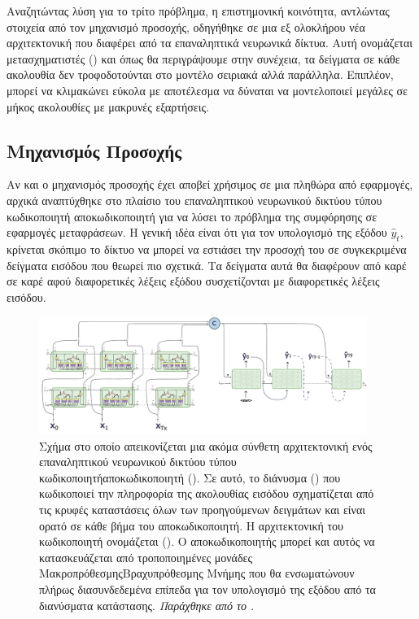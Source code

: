 Αναζητώντας λύση για το τρίτο πρόβλημα, η επιστημονική κοινότητα, αντλώντας στοιχεία από τον μηχανισμό προσοχής, οδηγήθηκε σε μια εξ ολοκλήρου νέα αρχιτεκτονική που διαφέρει από τα επαναληπτικά νευρωνικά δίκτυα. Αυτή ονομάζεται μετασχηματιστές ()\cite{transformers_attention_is_all_you_need} και όπως θα περιγράψουμε στην συνέχεια, τα δείγματα σε κάθε ακολουθία δεν τροφοδοτούνται στο μοντέλο σειριακά αλλά παράλληλα. Επιπλέον, μπορεί να κλιμακώνει εύκολα με αποτέλεσμα να δύναται να μοντελοποιεί μεγάλες σε μήκος ακολουθίες με μακρυνές εξαρτήσεις.\par

\subsection{Μηχανισμός Προσοχής}
Αν και ο μηχανισμός προσοχής έχει αποβεί χρήσιμος σε μια πληθώρα από εφαρμογές, αρχικά αναπτύχθηκε στο πλαίσιο του επαναληπτικού νευρωνικού δικτύου τύπου κωδικοποιητή αποκωδικοποιητή για να λύσει το πρόβλημα της συμφόρησης σε εφαρμογές μεταφράσεων. Η γενική ιδέα είναι ότι για τον υπολογισμό της εξόδου $\hat{y}_t$, κρίνεται σκόπιμο το δίκτυο να μπορεί να εστιάσει την προσοχή του σε συγκεκριμένα δείγματα εισόδου που θεωρεί πιο σχετικά. Τα δείγματα αυτά θα διαφέρουν από καρέ σε καρέ αφού διαφορετικές λέξεις εξόδου συσχετίζονται με διαφορετικές λέξεις εισόδου.\par

\begin{figure}[h]
  \centering
  \includegraphics[width=0.95\textwidth]{images/chapter theoritical background/rnn_peaky_encoder_decoder_complex.pdf}
  \caption{Σχήμα στο οποίο απεικονίζεται μια ακόμα σύνθετη αρχιτεκτονική ενός επαναληπτικού νευρωνικού δικτύου τύπου κωδικοποιητή\textendash αποκωδικοποιητή (). Σε αυτό, το διάνυσμα () που κωδικοποιεί την πληροφορία της ακολουθίας εισόδου σχηματίζεται από τις κρυφές καταστάσεις όλων των προηγούμενων δειγμάτων και είναι ορατό σε κάθε βήμα του αποκωδικοποιητή. Η αρχιτεκτονική του κωδικοποιητή ονομάζεται  (). Ο αποκωδικοποιητής μπορεί και αυτός να κατασκευάζεται από τροποποιημένες μονάδες Μακροπρόθεσμης\textendash Βραχυπρόθεσμης Μνήμης που θα ενσωματώνουν πλήρως διασυνδεδεμένα επίπεδα για τον υπολογισμό της εξόδου από τα διανύσματα κατάστασης. \textit{Παράχθηκε από το \href{https://inkscape.org/}{}}.}
  \label{fig:rnn_peaky_encoder_decoder_no_attention}
\end{figure}


